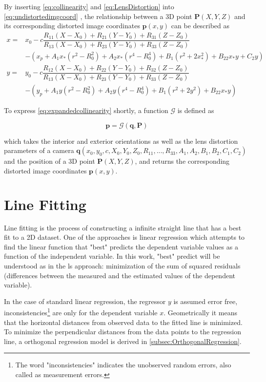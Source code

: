 By inserting \eqref{eq:collinearity} and \eqref{eq:LensDistortion} into \eqref{eq:undistortedimgcoord} , the relationship between a 3D point $\mathbf{P}(X, Y, Z)$ and its corresponding distorted image coordinates $\mathbf{p}(x,y)$ can be described as
\begin{equation} \label{eq:expandedcollinearity}
\begin{split}
x =& x_0-c\dfrac{R_{11}(X-X_0)+R_{21}(Y-Y_0)+R_{31}(Z-Z_0)}{R_{13}(X-X_0)+R_{23}(Y-Y_0)+R_{33}(Z-Z_0)} \\
&-(x_p + A_1x_*(r^2-R_0^2) + A_2x_*(r^4-R_0^4) + B_1(r^2+2x_*^2) + B_22x_*y+C_2y)\\
y =& y_0-c\dfrac{R_{12}(X-X_0)+R_{22}(Y-Y_0)+R_{32}(Z-Z_0)}{R_{13}(X-X_0)+R_{23}(Y-Y_0)+R_{33}(Z-Z_0)} \\
&-(y_p + A_1y  (r^2-R_0^2) + A_2y  (r^4-R_0^4) + B_1(r^2+2y^2)   + B_22x_*y)
\end{split}
\end{equation}

To express \eqref{eq:expandedcollinearity} shortly, a function $\mathcal{G}$ is defined as

\begin{equation} \label{eq:Gfunction}
\mathbf{p} = \mathcal{G}(\mathbf{q},\mathbf{P}) 
\end{equation}

which takes the interior and exterior orientations as well as the lens distortion parameters of a camera $\mathbf{q}(x_0,y_0,c,X_0,Y_0,Z_0,R_{11},...,R_{33},A_1,A_2,B_1,B_2,C_1,C_2)$ and the position of a 3D point $\mathbf{P}(X, Y, Z)$, and returns the corresponding distorted image coordinates $\mathbf{p}(x,y)$.


\section{Line Fitting}
\label{sec:LineFitting}

Line fitting is the process of constructing a infinite straight line that has a best fit to a 2D dataset. One of the approaches is linear regression which attempts to find the linear function that "best" predicts the dependent variable values as a function of the independent variable. In this work, "best" predict will be understood as in the \gls{ls} approach: minimization of the sum of squared residuals (differences between the measured and the estimated values of the dependent variable).

In the case of standard linear regression, the regressor $y$ is assumed error free, inconsistencies\footnote{The word "inconsistencies" indicates the unobserved random errors, also called as measurement errors.} are only for the dependent variable $x$. Geometrically it means that the horizontal distances from observed data to the fitted line is minimized. To minimize the perpendicular distances from the data points to the regression line, a orthogonal regression model is derived in \cref{subsec:OrthogonalRegression}.

